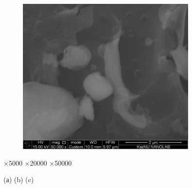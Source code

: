\begin{figure}[H]
	\centering
	\includegraphics[width=0.8\textwidth]{assets/1069}
	\caption*{}
\end{figure}

×5000 ×20000 ×50000

(а) (b) (c)

